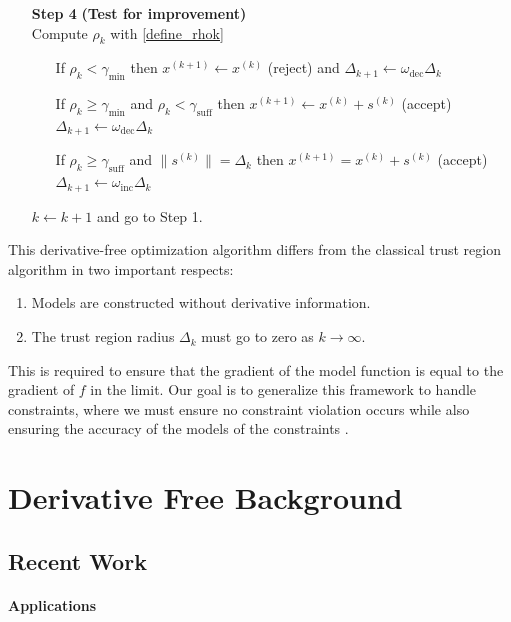 \documentclass{article}
\theoremstyle{case}
\numberwithin{theorem}{subsection}
\newcommand{\gammabi}{\gamma_{\textrm{suff}}}
\newcommand{\gammasm}{\gamma_{\textrm{min}}}
\newcommand{\mfk}{{{m}_f}^{(k)}}
\newcommand{\omegadec}{\omega_{\text{dec}}}
\newcommand{\omegainc}{\omega_{\text{inc}}}
\newcommand{\rk}{\rho_k}
\newcommand{\sk}{{{s}^{(k)}}}
\newcommand{\xkpo}{{{x}^{(k+1)}}}
\newcommand{\xk}{x^{(k)}}
\begin{document}
\begin{algorithm}[H]
\begin{itemize}
        \item[\textbf{Step 4}] \textbf{(Test for improvement)} \\
            Compute $\rk$ with \cref{define_rhok} \begin{itemize}
                \item[] If $\rk < \gammasm$ then $\xkpo \gets \xk$ (reject) and $\Delta_{k+1} \gets \omegadec\Delta_{k}$
                \item[] If $\rk \ge \gammasm$ and $\rk < \gammabi$ then $\xkpo\gets\xk+\sk$ (accept) $\Delta_{k+1} \gets \omegadec\Delta_{k}$
                \item[] If $\rk \ge \gammabi$ and $\|\sk\| = \Delta_{k}$ then $\xkpo=\xk+\sk$ (accept) $\Delta_{k+1} \gets \omegainc\Delta_{k}$
            \end{itemize}
            $k \gets k+1$ and go to Step 1.
    \end{itemize}
\end{algorithm}

This derivative-free optimization algorithm differs from the classical trust region algorithm in two important respects:
\begin{enumerate}
    \item Models are constructed without derivative information.
    \item The trust region radius $\Delta_k$ must go to zero as $k\to\infty$.
\end{enumerate}

This is required to ensure that the gradient of the model function is equal to the gradient of $f$ in the limit.
Our goal is to generalize this framework to handle constraints, 
where we must ensure no constraint violation occurs
\color{red}
while also ensuring the accuracy of the models of the constraints
\color{black}
.

\section{Derivative Free Background}
\subsection{Recent Work}
\paragraph{Applications}
\end{document}
